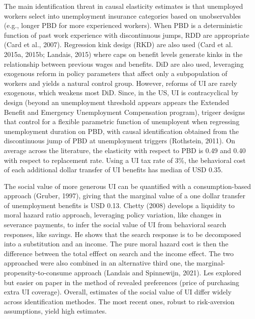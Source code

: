 \documentclass{article}
\begin{document}
The main identification threat in causal elasticity estimates is that unemployed workers select into unemployment insurance categories based on unobservables (e.g., longer PBD for more experienced workers). When PBD is a deterministic function of past work experience with discontinuous jumps, RDD are appropriate (Card et al., 2007). Regression kink desigs (RKD) are also used (Card et al. 2015a, 2015b; Landais, 2015) where caps on benefit levels generate kinks in the relationship between previous wages and benefits. DiD are also used, leveraging exogenous reform in policy parameters that affect only a subpopulation of workers and yields a natural control group. However, reforms of UI are rarely exogenous, which weakens most DiD. Since, in the US, UI is contracyclical by design (beyond an unemployment threshold appears appears the Extended Benefit and Emergency Unemployment Compensation program), trigeer designs that control for a flexible parametric function of unemployent when regressing unemployment duration on PBD, with causal identification obtained from the discontinuous jump of PBD at unemployment triggers (Rothstein, 2011). On average across the literature, the elasticity with respect to PBD is 0.49 and 0.40 with respect to replacement rate. Using a UI tax rate of 3\%, the behavioral cost of each additional dollar transfer of UI benefits has median of USD 0.35.

The social value of more generous UI can be quantified with a consumption-based approach (Gruber, 1997), giving that the marginal value of a one dollar transfer of unemployment benefits is USD 0.13. Chetty (2008) develops a liquidity to moral hazard ratio approach, leveraging policy variation, like changes in severance payments, to infer the social value of UI from behavioral search responses, like savings. He shows that the search response is to be decomposed into a substitution and an income. The pure moral hazard cost is then the difference between the total efffect on search and the income effect. The two approached were also combined in an alternative third one, the marginal-propensity-to-consume approach (Landais and Spinnewijn, 2021). Les explored but easier on paper in the method of revealed preferences (price of purchasing extra UI coverage). Overall, estimates of the social value of UI differ widely across identification methodes. The most recent ones, robust to risk-aversion assumptions, yield high estimates.
\end{document}
